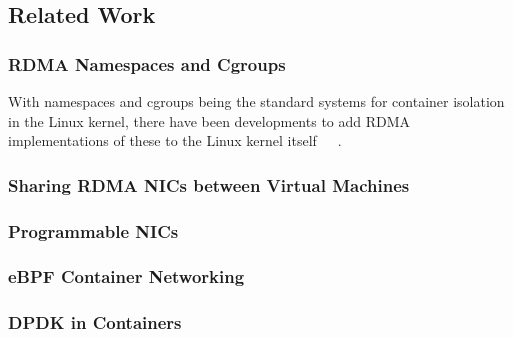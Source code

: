 \documentclass[12pt,titlepage]{article}
\begin{document}

\subsection{Related Work}


\subsubsection{RDMA Namespaces and Cgroups}
With namespaces and cgroups being the standard systems for container isolation in the Linux kernel, there have been developments to add RDMA implementations of these to the Linux kernel itself~\cite{rdmanamespace}~\cite{rdmacgroups}~\cite{mellanoxcontainersupdate2018}.

\subsubsection{Sharing RDMA NICs between Virtual Machines}
\subsubsection{Programmable NICs}
\subsubsection{eBPF Container Networking}
\subsubsection{DPDK in Containers}
\end{document}
